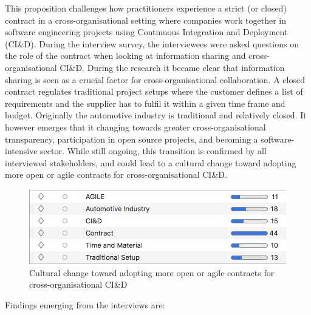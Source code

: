 This proposition challenges how practitioners experience a strict (or closed) contract in a cross-organisational setting where companies work together in software engineering projects using Continuous Integration and Deployment (CI\&D). During the interview survey, the interviewees were asked questions on the role of the contract when looking at information sharing and cross-organisational CI\&D. During the research it became clear that information sharing is seen as a crucial factor for cross-organisational collaboration. A closed contract regulates traditional project setups where the customer defines a list of requirements and the supplier has to fulfil it within a given time frame and budget. Originally the automotive industry is traditional and relatively closed. It however emerges that it changing towards greater cross-organisational transparency, participation in open source projects, and becoming a software-intensive sector. While still ongoing, this transition is confirmed by all interviewed stakeholders, and could lead to a cultural change toward adopting more open or agile contracts for cross-organisational CI\&D.

\begin{figure}[htb]
\centering
\includegraphics[width=\columnwidth]{figure/ss_CodeGroup6.png}
\caption{Cultural change toward adopting more open or agile contracts for cross-organisational CI\&D}
\label{fig:towardsAgile}
\end{figure}


Findings emerging from the interviews are:

